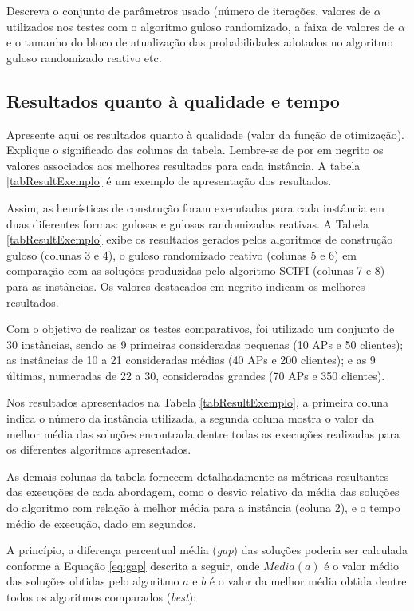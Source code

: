 \documentclass[12pt,fleqn]{article}
\begin{document}
Descreva o conjunto de parâmetros usado (número de iterações, valores de $\alpha$ utilizados nos testes com o algoritmo guloso randomizado, a faixa de valores de $\alpha$ e o tamanho do bloco de atualização das probabilidades adotados no algoritmo guloso randomizado reativo etc. 

\subsection{Resultados quanto à qualidade e tempo}
\label{subSecResultados}
Apresente aqui os resultados quanto à qualidade (valor da função de otimização). Explique o significado das colunas da tabela. Lembre-se de por em negrito os valores associados aos melhores resultados para cada instância. A tabela \ref{tabResultExemplo} é um exemplo de apresentação dos resultados.

Assim, as heurísticas de construção foram executadas para cada instância em duas diferentes formas: gulosas e gulosas randomizadas reativas. A Tabela \ref{tabResultExemplo} exibe os resultados gerados pelos algoritmos de construção guloso (colunas 3 e 4), o guloso randomizado reativo (colunas 5 e 6) em comparação com as soluções produzidas pelo algoritmo SCIFI (colunas 7 e 8) para as instâncias. Os valores destacados em negrito indicam os melhores resultados.

Com o objetivo de realizar os testes comparativos, foi utilizado um conjunto de 30 instâncias, sendo as 9 primeiras consideradas pequenas (10 APs e 50 clientes); as instâncias de 10 a 21 consideradas médias (40 APs e 200 clientes); e as 9 últimas, numeradas de 22 a 30, consideradas grandes (70 APs e 350 clientes).

Nos resultados apresentados na Tabela \ref{tabResultExemplo}, a primeira coluna indica o número da instância utilizada, a segunda coluna mostra o valor da melhor média das soluções encontrada dentre todas as execuções realizadas para os diferentes algoritmos apresentados.

As demais colunas da tabela fornecem detalhadamente as métricas resultantes das execuções de cada abordagem, como o desvio relativo da média das soluções do algoritmo com relação à melhor média para a instância (coluna 2), e o tempo médio de execução, dado em segundos.

A princípio, a diferença percentual média (\textit{gap}) das soluções poderia ser calculada conforme a Equação \ref{eq:gap} descrita a seguir, onde $Media(a)$ é o valor médio das soluções obtidas pelo algoritmo $a$ e $b$ é o valor da melhor média obtida dentre todos os algoritmos comparados (\textit{best}):
\end{document}
